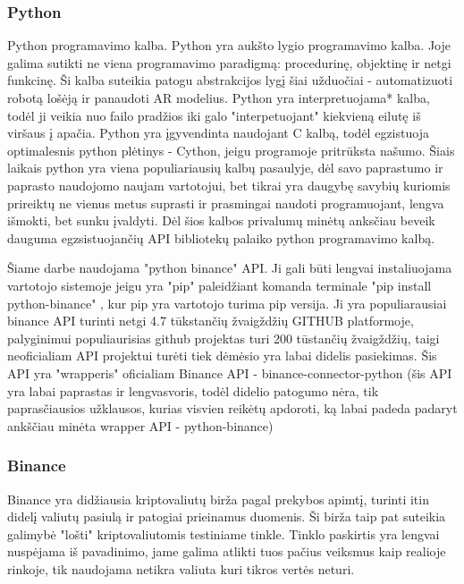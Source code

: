 \documentclass{VUMIFInfKursinis}
\begin{document}
\subsubsection{Python}
Python programavimo kalba. Python yra aukšto lygio programavimo kalba. Joje galima sutikti ne viena programavimo paradigmą:
procedurinę, objektinę ir netgi funkcinę. Ši kalba suteikia patogu abstrakcijos lygį šiai užduočiai - automatizuoti robotą lošėją ir panaudoti AR modelius.
Python yra interpretuojama* kalba, todėl ji veikia nuo failo pradžios iki galo "interpetuojant" kiekvieną eilutę iš viršaus į apačia.
Python yra įgyvendinta naudojant C kalbą, todėl egzistuoja optimalesnis python plėtinys - Cython, jeigu programoje pritrūksta našumo. Šiais laikais
python yra viena populiariausių kalbų pasaulyje, dėl savo paprastumo ir paprasto naudojomo naujam vartotojui, bet tikrai yra daugybę savybių
kuriomis prireiktų ne vienus metus suprasti ir prasmingai naudoti programuojant, lengva išmokti, bet sunku įvaldyti. Dėl šios kalbos privalumų minėtų anksčiau
beveik dauguma egzsistuojančių API bibliotekų palaiko python programavimo kalbą.

Šiame darbe naudojama "python binance" API. Ji gali būti lengvai instaliuojama vartotojo sistemoje jeigu yra "pip" paleidžiant komanda terminale "pip install python-binance"
, kur pip yra vartotojo turima pip versija. Ji yra populiarausiai binance API turinti netgi 4.7 tūkstančių žvaigždžių GITHUB platformoje\cite{DokTest}, palyginimui populiaurisias github projektas turi
200 tūstančių žvaigždžių, taigi neoficialiam API projektui turėti tiek dėmėsio yra labai didelis pasiekimas. Šis API yra "wrapperis" oficialiam Binance 
API - binance-connector-python (šis API yra labai paprastas ir lengvasvoris, todėl didelio patogumo nėra, tik paprasčiausios užklausos, kurias visvien
reikėtų apdoroti, ką labai padeda padaryt ankščiau minėta wrapper API - python-binance)  

\subsubsection{Binance}
Binance yra didžiausia kriptovaliutų birža pagal prekybos apimtį, turinti itin didelį valiutų pasiulą ir patogiai prieinamus duomenis. Ši birža taip pat
suteikia galimybė "lošti" kriptovaliutomis testiniame tinkle. Tinklo paskirtis yra lengvai nuspėjama iš pavadinimo, jame galima atlikti tuos pačius 
veiksmus kaip realioje rinkoje, tik naudojama netikra valiuta kuri tikros vertės neturi. 
\end{document}
